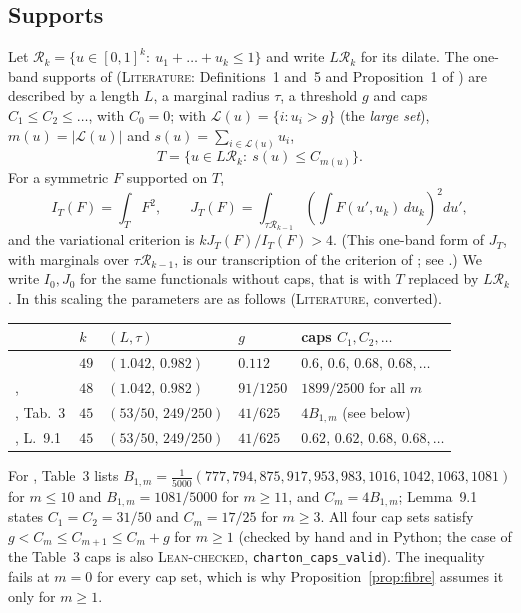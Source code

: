 \documentclass[11pt]{amsart}
\theoremstyle{definition}
\theoremstyle{remark}
\newcommand{\lbl}[1]{\textup{\textsc{#1}}}
\newcommand{\R}{\mathcal{R}}
\begin{document}
\subsection*{Supports}
Let
$\R_k=\{u\in[0,1]^k:\ u_1+\dots+u_k\le1\}$ and write $L\R_k$ for its dilate.
The one-band supports of \cite{Sta26} (\lbl{Literature}: Definitions~1
and~5 and Proposition~1 of \cite{Sta26}) are described by a length $L$, a marginal radius
$\tau$, a threshold $g$ and caps $C_1\le C_2\le\dots$, with $C_0=0$; with
$\mathcal L(u)=\{i:u_i>g\}$ (the \emph{large set}), $m(u)=|\mathcal L(u)|$ and
$s(u)=\sum_{i\in\mathcal L(u)}u_i$,
\[
T=\{u\in L\R_k:\ s(u)\le C_{m(u)}\}.
\]
For a symmetric $F$ supported on $T$,
\[
I_T(F)=\int_TF^2,\qquad
J_T(F)=\int_{\tau\R_{k-1}}\left(\int F(u',u_k)\,du_k\right)^2du',
\]
and the variational criterion is $kJ_T(F)/I_T(F)>4$. (This one-band form of
$J_T$, with marginals over $\tau\R_{k-1}$, is our transcription of the
criterion of \cite[Prop.~1]{Sta26}; see \cite[\S5]{Kim26}.) We write
$I_0,J_0$ for the same functionals without caps, that is with $T$ replaced by
$L\R_k$. In this scaling the parameters are as follows (\lbl{Literature},
converted).
\begin{center}\small
\begin{tabular}{@{}lllll@{}}
\toprule
 & $k$ & $(L,\tau)$ & $g$ & caps $C_1,C_2,\dots$\\
\midrule
\cite{Sta26} & $49$ & $(1.042,\,0.982)$ & $0.112$ & $0.6,\,0.6,\,0.68,\,0.68,\dots$\\
\cite{Kin26}, \cite{SY26} & $48$ & $(1.042,\,0.982)$ & $91/1250$ & $1899/2500$ for all $m$\\
\cite{Cha26}, Tab.~3 & $45$ & $(53/50,\,249/250)$ & $41/625$ & $4B_{1,m}$ (see below)\\
\cite{Cha26}, L.~9.1 & $45$ & $(53/50,\,249/250)$ & $41/625$ & $0.62,\,0.62,\,0.68,\,0.68,\dots$\\
\bottomrule
\end{tabular}
\end{center}
For \cite{Cha26}, Table~3 lists
$B_{1,m}=\frac1{5000}(777,794,875,917,953,983,1016,1042,1063,1081)$ for
$m\le10$ and $B_{1,m}=1081/5000$ for $m\ge11$, and $C_m=4B_{1,m}$; Lemma~9.1
states $C_1=C_2=31/50$ and $C_m=17/25$ for $m\ge3$. All four cap sets satisfy
$g<C_m\le C_{m+1}\le C_m+g$ for $m\ge1$ (checked by hand and in Python; the
case of the Table~3 caps is also \lbl{Lean-checked}, \texttt{charton\_caps\_valid}).
The inequality fails at $m=0$ for every cap set, which is why
Proposition~\ref{prop:fibre} assumes it only for $m\ge1$.
\end{document}
